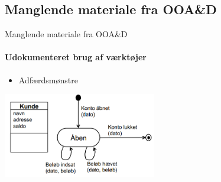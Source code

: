\subsection{Manglende materiale fra OOA\&D}
\begin{frame}{Manglende materiale fra OOA\&D}
	\framesubtitle{Udokumenteret brug af værktøjer}
	\begin{itemize} 
    \item Adfærdsmønstre
  \end{itemize}
  	 \vspace{4 mm}

  \includegraphics[width=0.5\textwidth]{images/adfaersmoenster.PNG}
\end{frame}